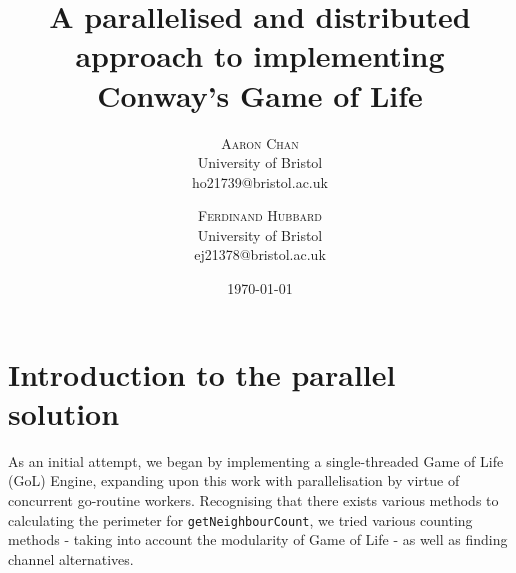 \documentclass[twoside,twocolumn]{article}
\title{A parallelised and distributed approach to implementing Conway's Game of Life} %
\author{%
\textsc{Aaron Chan}\\[1ex] %
\normalsize University of Bristol \\ %
\normalsize {ho21739@bristol.ac.uk} %
\and %
\textsc{Ferdinand Hubbard}\\[1ex] %
\normalsize University of Bristol \\ %
\normalsize {ej21378@bristol.ac.uk} %
}
\date{\today} %
\begin{document}
\maketitle

\section{Introduction to the parallel solution}

As an initial attempt, we began by implementing a 
single-threaded Game of Life (GoL) Engine, expanding upon this work 
with parallelisation by virtue of concurrent go-routine workers. 
Recognising that there exists various methods to calculating the perimeter
for \texttt{getNeighbourCount}, we tried various counting methods - taking into 
account the modularity of Game of Life - as well as finding channel alternatives.

\end{document}
